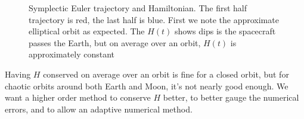 \begin{figure}
    \centering
        \caption{Symplectic Euler trajectory and Hamiltonian. The first half trajectory is red, the last half is blue. First we note the approximate elliptical orbit as expected. The $H(t)$ shows dips is the spacecraft passes the Earth, but on average over an orbit, $H(t)$ is approximately constant} %
        \label{fig:r3b_symplectic_euler}
\end{figure}
Having $H$ conserved on average over an orbit is fine for a closed orbit, but for chaotic orbits around both Earth and Moon, it's not nearly good enough. We want a higher order method to conserve $H$ better, to better gauge the numerical errors, and to allow an adaptive numerical method.

